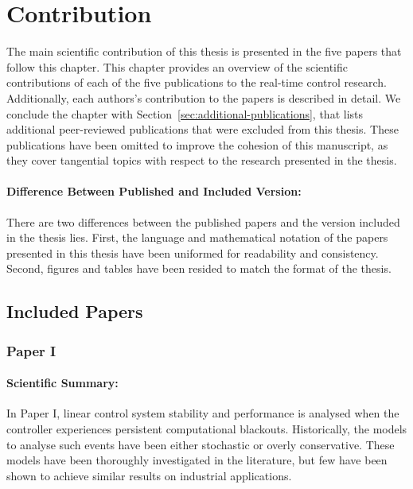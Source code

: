 \chapter{Contribution}%
\label{ch:contribution}%
%

The main scientific contribution of this thesis is presented in the five papers that follow this chapter.
This chapter provides an overview of the scientific contributions of each of the five publications to the real-time control research.
Additionally, each authors's contribution to the papers is described in detail.
We conclude the chapter with Section~\ref{sec:additional-publications}, that lists additional peer-reviewed publications that were excluded from this thesis.
These publications have been omitted to improve the cohesion of this manuscript, as they cover tangential topics with respect to the research presented in the thesis.

\subsubsection*{Difference Between Published and Included Version:}%
There are two differences between the published papers and the version included in the thesis lies.
First, the language and mathematical notation of the papers presented in this thesis have been uniformed for readability and consistency.
Second, figures and tables have been resided to match the format of the thesis.


\section{Included Papers}%
\label{sec:paper-summaries}%
%
\subsection*{Paper I}%
%
\begin{quote}
\end{quote}

\subsubsection*{Scientific Summary:}%
%
In Paper I, linear control system stability and performance is analysed when the controller experiences persistent computational blackouts.
Historically, the models to analyse such events have been either stochastic or overly conservative.
These models have been thoroughly investigated in the literature, but few have been shown to achieve similar results on industrial applications.

